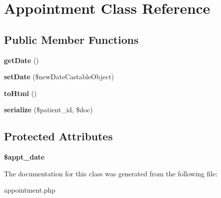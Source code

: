 \hypertarget{classAppointment}{\section{Appointment Class Reference}
\label{classAppointment}
}
\subsection*{Public Member Functions}
\begin{DoxyCompactItemize}
\item 
\hypertarget{classAppointment_a1318709efa67c9ddf1f5b7e8f64dad29}{{\bfseries get\-Date} ()}\label{classAppointment_a1318709efa67c9ddf1f5b7e8f64dad29}

\item 
\hypertarget{classAppointment_a1482fe77ebb7c3a9ad0be7df1548cbb1}{{\bfseries set\-Date} (\$new\-Date\-Castable\-Object)}\label{classAppointment_a1482fe77ebb7c3a9ad0be7df1548cbb1}

\item 
\hypertarget{classAppointment_a490b9b4de796aed6aed62c1d2bc45285}{{\bfseries to\-Html} ()}\label{classAppointment_a490b9b4de796aed6aed62c1d2bc45285}

\item 
\hypertarget{classAppointment_aedd49cb6bfa6179859e452c0fb2293b3}{{\bfseries serialize} (\$patient\-\_\-id, \$doc)}\label{classAppointment_aedd49cb6bfa6179859e452c0fb2293b3}

\end{DoxyCompactItemize}
\subsection*{Protected Attributes}
\begin{DoxyCompactItemize}
\item 
\hypertarget{classAppointment_ae37eedaed26a624781499846421b4eaf}{{\bfseries \$appt\-\_\-date}}\label{classAppointment_ae37eedaed26a624781499846421b4eaf}

\end{DoxyCompactItemize}


The documentation for this class was generated from the following file\-:\begin{DoxyCompactItemize}
\item 
appointment.\-php\end{DoxyCompactItemize}
